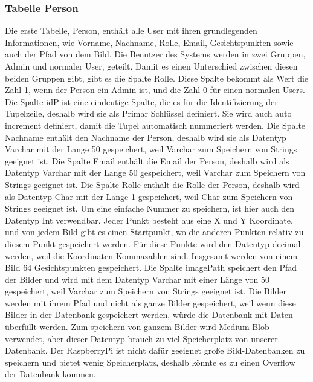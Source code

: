\subsubsection{Tabelle Person}
Die erste Tabelle, Person, enthält alle User mit ihren grundlegenden Informationen, wie Vorname, Nachname, Rolle, Email, Gesichtspunkten sowie auch der Pfad von dem Bild. Die Benutzer des Systems werden in zwei Gruppen, Admin und normaler User, geteilt. Damit es einen Unterschied zwischen diesen beiden Gruppen gibt, gibt es die Spalte Rolle. Diese Spalte bekommt als Wert die Zahl 1, wenn der Person ein Admin ist, und die Zahl 0 für einen normalen Users.
\bigbreak
Die Spalte idP ist eine eindeutige Spalte, die es für die Identifizierung der Tupelzeile, deshalb wird sie als Primar Schlüssel definiert. Sie wird auch auto increment definiert, damit die Tupel automatisch nummeriert werden.
\bigbreak
Die Spalte Nachname enthält den Nachname der Person, deshalb wird sie als Datentyp Varchar mit der Lange 50 gespeichert, weil Varchar zum Speichern von Strings geeignet ist.
\bigbreak
Die Spalte Email enthält die Email der Person, deshalb wird als Datentyp Varchar mit der Lange 50 gespeichert, weil Varchar zum Speichern von Strings geeignet ist.
\bigbreak
Die Spalte Rolle enthält die Rolle der Person, deshalb wird als Datentyp Char mit der Lange 1 gespeichert, weil Char zum Speichern von Strings geeignet ist. Um eine einfache Nummer zu speichern, ist hier auch den Datentyp Int verwendbar.
\bigbreak
Jeder Punkt besteht aus eine X und Y Koordinate, und von jedem Bild gibt es einen Startpunkt, wo die anderen Punkten relativ zu diesem Punkt gespeichert werden. Für diese Punkte wird den Datentyp decimal werden, weil die Koordinaten Kommazahlen sind. Insgesamt werden von einem Bild 64 Gesichtspunkten gespeichert.
\bigbreak
Die Spalte imagePath speichert den Pfad der Bilder und wird mit dem Datentyp Varchar mit einer Länge von 50 gespeichert, weil Varchar zum Speichern von Strings geeignet ist. Die Bilder werden mit ihrem Pfad und nicht als ganze Bilder gespeichert, weil wenn diese Bilder in der Datenbank gespeichert werden, würde die Datenbank mit Daten überfüllt werden. Zum speichern von ganzem Bilder wird Medium Blob verwendet, aber dieser Datentyp brauch zu viel Speicherplatz von unserer Datenbank. Der RaspberryPi ist nicht dafür geeignet große Bild-Datenbanken zu speichern und bietet wenig Speicherplatz, deshalb könnte es zu einen Overflow der Datenbank kommen.

